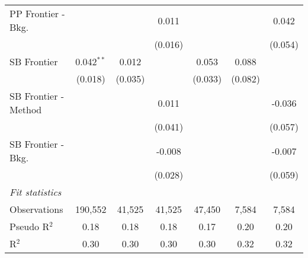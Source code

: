 \begin{tabular}{lcccccc}
   PP Frontier - Bkg.   &               &               & 0.011         &              &              & 0.042\\   
                        &               &               & (0.016)       &              &              & (0.054)\\   
   SB Frontier          & 0.042$^{**}$  & 0.012         &               & 0.053        & 0.088        &   \\   
                        & (0.018)       & (0.035)       &               & (0.033)      & (0.082)      &   \\   
   SB Frontier - Method &               &               & 0.011         &              &              & -0.036\\   
                        &               &               & (0.041)       &              &              & (0.057)\\   
   SB Frontier - Bkg.   &               &               & -0.008        &              &              & -0.007\\   
                        &               &               & (0.028)       &              &              & (0.059)\\   
   \midrule
   \emph{Fit statistics}\\
   Observations         & 190,552       & 41,525        & 41,525        & 47,450       & 7,584        & 7,584\\  
   Pseudo R$^2$         & 0.18          & 0.18          & 0.18          & 0.17         & 0.20         & 0.20\\  
   R$^2$                & 0.30          & 0.30          & 0.30          & 0.30         & 0.32         & 0.32\\  
   

\end{tabular}
